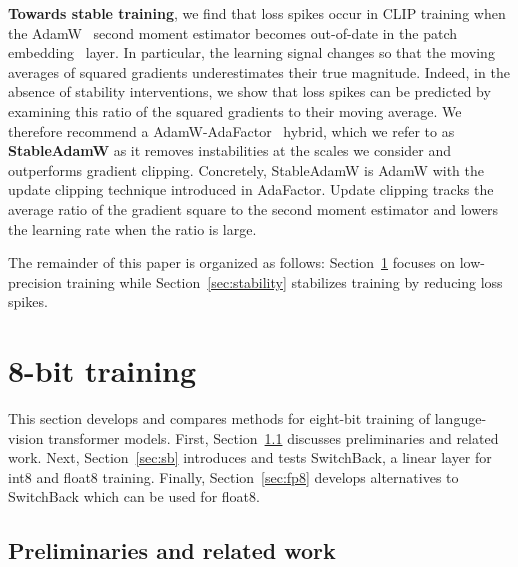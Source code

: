 \textbf{Towards stable training}, we find that loss spikes occur in CLIP training when the AdamW~\cite{loshchilov2018decoupled} second moment estimator becomes out-of-date in the patch embedding~\cite{dosovitskiy2021an} layer. In particular, the learning signal changes so that the moving averages of squared gradients underestimates their true magnitude. Indeed, in the absence of stability interventions, we show that loss spikes can be predicted by examining this ratio of the squared gradients to their moving average. We therefore recommend a AdamW-AdaFactor~\cite{shazeer2018adafactor} hybrid, which we refer to as \textbf{StableAdamW} as it removes instabilities at the scales we consider and outperforms gradient clipping. Concretely, StableAdamW is AdamW with the update clipping technique introduced in AdaFactor. Update clipping tracks the average ratio of the gradient square to the second moment estimator and lowers the learning rate when the ratio is large.

The remainder of this paper is organized as follows: Section~\ref{sec:precision} focuses on low-precision training while Section~\ref{sec:stability} stabilizes training by reducing loss spikes.

\section{8-bit training}\label{sec:precision}

This section develops and compares methods for eight-bit training of languge-vision transformer models. First, Section~\ref{sec:8related} discusses preliminaries and related work. Next, Section~\ref{sec:sb} introduces and tests SwitchBack, a linear layer for int8 and float8 training. Finally, Section~\ref{sec:fp8} develops alternatives to SwitchBack which can be used for float8.

\subsection{Preliminaries and related work}\label{sec:8related}

